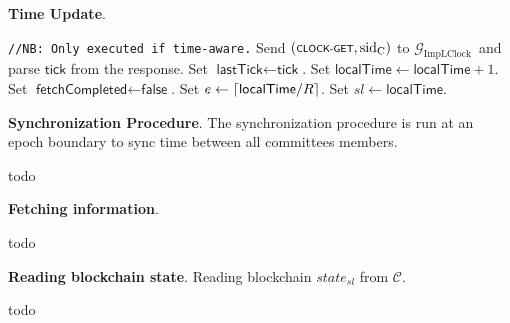 \textbf{Time Update}.\label{apndx:update-time-protocol}
\begin{protocol}
    \caption{$\textsf{UpdateTime}(P, R)$}
    \begin{algorithmic}[1]
        \noindent
        \lstinline|//NB: Only executed if time-aware.|
        \State Send $(\textsf{\scriptsize{CLOCK-GET}}, \text{sid}_\text{C})$ to $\mathcal{G}_{\text{ImpLClock}}$\
        and parse $\textsf{tick}$ from the response.
            \State Set $\textsf{lastTick} \leftarrow \textsf{tick}$.
            \State Set $\textsf{localTime} \leftarrow \textsf{localTime} + 1$.
            \State Set $\textsf{fetchCompleted} \leftarrow \textsf{false}$.
        \EndIf
        \State Set $e \leftarrow \lceil \textsf{localTime}/\\R \rceil$.
        \State Set $sl \leftarrow \textsf{localTime}$.

    \end{algorithmic}\label{alg:update-time-protocol}
\end{protocol}

\bigbreak
\bigbreak
\noindent
{}
\textbf{Synchronization Procedure}.\label{apndx:sync-proc}
The synchronization procedure is run at an epoch boundary to sync time between all committees members.
\begin{protocol}
    \caption{$\textsf{SyncProc}(P, \text{sid}, R)$}
    \begin{algorithmic}[1]

        todo
    \end{algorithmic}\label{alg:sync-proc}
\end{protocol}

\bigbreak
\bigbreak
\noindent
{}
\textbf{Fetching information}.\label{apndx:fetch-info-protocol}
\begin{protocol}
    \caption{$\textsf{FetchInformation}(P, \text{sid})$}
    \begin{algorithmic}[1]

        todo
    \end{algorithmic}\label{alg:fetch-info-protocol}
\end{protocol}

\bigbreak
\bigbreak
\noindent
{}
\textbf{Reading blockchain state}.\label{apndx:read-state-protocol}
Reading blockchain $state_{sl}$ from  $\mathcal{C}$.
\begin{protocol}
    \caption{$\textsf{ReadState}(P, \text{sid}, sl, R, K_{\text{f}}, \mathcal{C})$}
    \begin{algorithmic}[1]

        todo
    \end{algorithmic}\label{alg:read-state-protocol}
\end{protocol}

